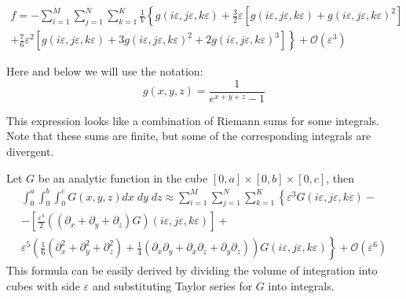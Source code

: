\documentclass{article}
\begin{document}
\begin{multline}
  \label{eq:4}
  f=- \sum_{i=1}^{M} \sum_{j=1}^{N} \sum_{k=1}^{K} \frac{1}{V}\left\{
    g(i\varepsilon,j\varepsilon,k\varepsilon)+
    \frac{3}{2}\varepsilon\left[g(i\varepsilon,j\varepsilon,k\varepsilon)+g(i\varepsilon,j\varepsilon,k\varepsilon)^{2}\right]\right.\\
  \left.+\frac{7}{6}\varepsilon^{2}\left[g(i\varepsilon,j\varepsilon,k\varepsilon)+3 g(i\varepsilon,j\varepsilon,k\varepsilon)^{2}+
      2 g(i\varepsilon,j\varepsilon,k\varepsilon)^{3}\right]\right\}  + \mathcal{O}(\varepsilon^{3})
\end{multline}

Here and below we will use the notation:
\begin{equation}
  \label{eq:5}
  g(x,y,z)=\frac{1}{e^{x+y+z}-1}
\end{equation}

This expression looks like a combination of Riemann sums for some integrals. Note that these sums
are finite, but some of the corresponding integrals are divergent.


Let $G$ be an analytic function in the cube $[0,a]\times[0,b]\times[0,c]$, then
\begin{multline}
  \label{eq:21}
  \int_{0}^{a} \int_{0}^{b}\int_{0}^{c}G(x,y,z) dx\; dy\;
  dz\approx\sum_{i=1}^{M}\sum_{j=1}^{N}\sum_{k=1}^{K}\left\{\varepsilon^{3}G\left(i\varepsilon,j\varepsilon,k\varepsilon\right)-\right.\\
  \left.-\left[\frac{\varepsilon^{4}}{2}\left((\partial_{x}+\partial_{y}+\partial_{z})G\right)(i\varepsilon,j\varepsilon,k\varepsilon)\right]+\right.\\
  \left.\varepsilon^{5}\left(\frac{1}{6}(\partial_{x}^{2}+\partial_{y}^{2}+\partial_{z}^{2})+\frac{1}{4}(\partial_{x}\partial_{y}+\partial_{x}\partial_{z}+\partial_{y}\partial_{z})\right)G\left(i\varepsilon,j\varepsilon,k\varepsilon\right)
  \right\}+\mathcal{O}(\varepsilon^{6})
\end{multline}
This formula can be easily derived by dividing the volume of integration into cubes with side
$\varepsilon$ and substituting Taylor series for $G$ into integrals.
\end{document}
